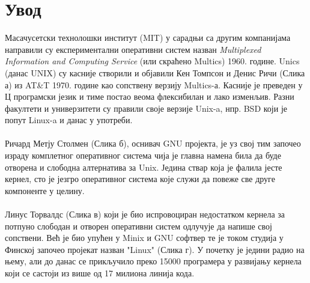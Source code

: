 \documentclass[a4paper,14pt]{article}
\begin{document}
\section*{Увод}
Масачусетски технолошки институт (MIT) у сарадњи са другим компанијама направили су експериментални оперативни систем назван \textit{Multiplexed Information and Computing Service} (или скраћено Multics) 1960. године. Unics (данас UNIX) су касније створили и објавили Кен Томпсон и Денис Ричи (Слика а) из AT\&T 1970. године као сопствену верзију Multics-а. Касније је преведен у Ц програмски језик и тиме постао веома флексибилан и лако изменљив. Разни факултети и универзитети су правили своје верзије Unix-a, нпр. BSD који је попут Linux-a и данас у употреби.\cite{revos}
\\\\
Ричард Метју Столмен (Слика б), оснивач GNU пројекта\cite{gnu}, је уз свој тим започео израду комплетног оперативног система чија је главна намена била да буде отворена и слободна алтернатива за Unix. Једина ствар која је фалила јесте кернел, сто је језгро оперативног система које служи да повеже све друге компоненте у целину.
\\\\
Линус Торвалдс (Слика в) који је био испровоциран недостатком кернела за потпуно слободан и отворен оперативни систем одлучује да напише свој сопствени. Већ је био упућен у Minix и GNU софтвер те је током студија у Финској започео пројекат назван "Linux" (Слика г). У почетку је једини радио на њему, али до данас се прикључило преко 15000 програмера у развијању кернела који се састоји из више од 17 милиона линија кода\cite{linuxfoundation}.
\\\\
\end{document}
